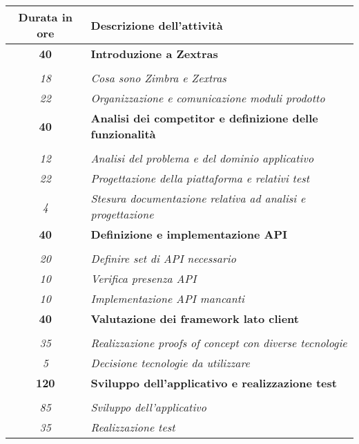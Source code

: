 

\begin{tabularx}{\textwidth}{|c|X|}
	\hline
	\textbf{Durata in ore} & \textbf{Descrizione dell'attività} \\\hline
	
	\textbf{40} & \textbf{Introduzione a Zextras} \\ \hdashline 
	\multirow{2}{0cm}\\ 
    \textit{18} & 
    \textit{Cosa sono Zimbra e Zextras} \\
    \textit{22} & 
    \textit{Organizzazione e comunicazione moduli prodotto} \\	 
    \hline
    
    
    
    \textbf{40} & \textbf{Analisi dei competitor e definizione delle funzionalità} \\ \hdashline 
    \multirow{3}{0cm}\\ 
    \textit{12} & 
    \textit{Analisi del problema e del dominio applicativo} \\
    \textit{22} & 
    \textit{Progettazione della piattaforma e relativi test} \\
    \textit{4} & 
    \textit{Stesura documentazione relativa ad analisi e progettazione} \\
    \hline  
    
    
     
       \textbf{40} & \textbf{Definizione e implementazione API} \\ \hdashline 
    \multirow{3}{0cm}\\ 
    \textit{20} & 
    \textit{Definire set di API necessario} \\
    \textit{10} & 
    \textit{Verifica presenza API} \\
    \textit{10} & 
    \textit{Implementazione API mancanti} \\
    \hline 
    
    
    \textbf{40} & \textbf{Valutazione dei framework lato client} \\ \hdashline 
    \multirow{2}{0cm}\\ 
    \textit{35} & 
    \textit{Realizzazione proofs of concept con diverse tecnologie} \\
    \textit{5} & 
    \textit{Decisione tecnologie da utilizzare} \\
    \hline 
    
	\textbf{120} & \textbf{Sviluppo dell'applicativo e realizzazione test} \\ 		\hdashline 
    \multirow{2}{0cm}\\ 
    \textit{85} & 
    \textit{Sviluppo dell'applicativo} \\
    \textit{35} & 
    \textit{Realizzazione test} \\
    \hline     
    

\end{tabularx}
